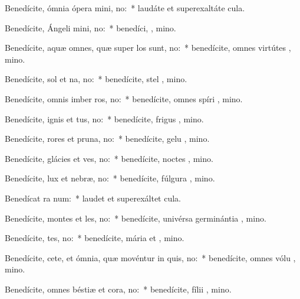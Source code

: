 \item Benedícite, ómnia ópera mini, no:~* laudáte et superexaltáte   cula.
\item Benedícite, Ángeli mini, no:~* benedíci, , mino.
\item Benedícite, aquæ omnes, quæ super los sunt, no:~* benedícite, omnes virtútes , mino.
\item Benedícite, sol et na, no:~* benedícite, stel , mino.
\item Benedícite, omnis imber  ros, no:~* benedícite, omnes spíri , mino.
\item Benedícite, ignis et tus, no:~* benedícite, frigus  , mino.
\item Benedícite, rores et pruna, no:~* benedícite, gelu  , mino.
\item Benedícite, glácies et ves, no:~* benedícite, noctes  , mino.
\item Benedícite, lux et nebræ, no:~* benedícite, fúlgura  , mino.
\item Benedícat ra num:~* laudet et superexáltet   cula.
\item Benedícite, montes et les, no:~* benedícite, univérsa germinántia  , mino.
\item Benedícite, tes, no:~* benedícite, mária et , mino.
\item Benedícite, cete, et ómnia, quæ movéntur in quis, no:~* benedícite, omnes vólu , mino.
\item Benedícite, omnes béstiæ et cora, no:~* benedícite, fílii , mino.
